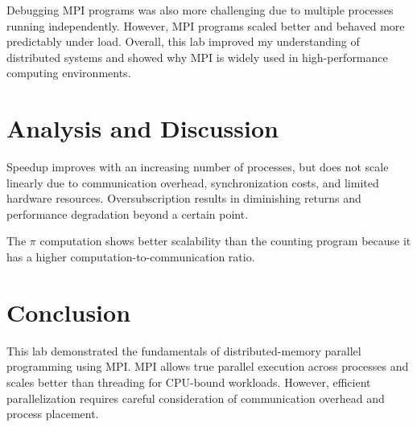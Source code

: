 \documentclass[12pt,a4paper]{article}
\begin{document}
Debugging MPI programs was also more challenging due to multiple processes
running independently.
However, MPI programs scaled better and behaved more predictably under load.
Overall, this lab improved my understanding of distributed systems and showed
why MPI is widely used in high-performance computing environments.

\section{Analysis and Discussion}

Speedup improves with an increasing number of processes, but does not scale
linearly due to communication overhead, synchronization costs, and limited
hardware resources. Oversubscription results in diminishing returns and
performance degradation beyond a certain point.

The $\pi$ computation shows better scalability than the counting program
because it has a higher computation-to-communication ratio.

\section{Conclusion}

This lab demonstrated the fundamentals of distributed-memory parallel
programming using MPI. MPI allows true parallel execution across processes
and scales better than threading for CPU-bound workloads. However, efficient
parallelization requires careful consideration of communication overhead
and process placement.
\end{document}
